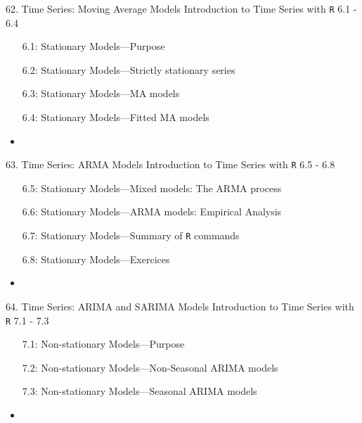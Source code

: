 \documentclass[12pt, titlepage, french]{report}
\begin{document}
\begin{CHPT_SUMM_AUTO}[label = {L.-62}]{62. Time Series: Moving Average Models}
Introduction to Time Series with \texttt{R} 6.1 - 6.4
\begin{itemize}
	\item[6.1:]	Stationary Models---Purpose
	\item[6.2:]	Stationary Models---Strictly stationary series
	\item[6.3:]	Stationary Models---MA models
	\item[6.4:]	Stationary Models---Fitted MA models
\end{itemize}
\tcbline
	\begin{itemize}
		\item	
	\end{itemize}
\end{CHPT_SUMM_AUTO}

\begin{CHPT_SUMM_AUTO}[label = {L.-63}]{63. Time Series: ARMA Models}
Introduction to Time Series with \texttt{R} 6.5 - 6.8
\begin{itemize}
	\item[6.5:]	Stationary Models---Mixed models: The ARMA process
	\item[6.6:]	Stationary Models---ARMA models: Empirical Analysis
	\item[6.7:]	Stationary Models---Summary of \texttt{R} commands
	\item[6.8:]	Stationary Models---Exercices
\end{itemize}
\tcbline
	\begin{itemize}
		\item	
	\end{itemize}
\end{CHPT_SUMM_AUTO}

\begin{CHPT_SUMM_AUTO}[label = {L.-64}]{64. Time Series: ARIMA and SARIMA Models}
Introduction to Time Series with \texttt{R} 7.1 - 7.3
\begin{itemize}
	\item[7.1:]	Non-stationary Models---Purpose
	\item[7.2:]	Non-stationary Models---Non-Seasonal ARIMA models
	\item[7.3:]	Non-stationary Models---Seasonal ARIMA models
\end{itemize}
\tcbline
	\begin{itemize}
		\item	
	\end{itemize}
\end{CHPT_SUMM_AUTO}
\end{document}
